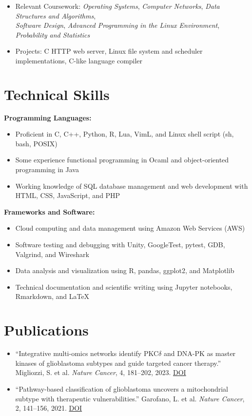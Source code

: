 \documentclass[11pt,a4paper]{article}   %
\begin{document}
\begin{itemize}
  \item Relevant Coursework:
    \textit{Operating Systems}, \textit{Computer Networks}, \textit{Data Structures and Algorithms},\\
    \textit{Software Design}, \textit{Advanced Programming in the Linux Environment}, \textit{Probability and Statistics}
  \item Projects: C HTTP web server, Linux file system and scheduler implementations, C-like language compiler
\end{itemize}

\section*{Technical Skills} %
\textbf{Programming Languages:}
\begin{itemize}
  \item Proficient in C, C++, Python, R, Lua, VimL, and Linux shell script (sh, bash, POSIX)
  \item Some experience functional programming in Ocaml and object-oriented programming in Java
  \item Working knowledge of SQL database management and web development with HTML, CSS, JavaScript, and PHP
\end{itemize}

\textbf{Frameworks and Software:}
\begin{itemize}
  \item Cloud computing and data management using Amazon Web Services (AWS)
  \item Software testing and debugging with Unity, GoogleTest, pytest, GDB, Valgrind, and Wireshark
  \item Data analysis and visualization using R, pandas, ggplot2, and Matplotlib
  \item Technical documentation and scientific writing using Jupyter notebooks, Rmarkdown, and \LaTeX
\end{itemize}

\section*{Publications} %
\begin{itemize}
  \item ``Integrative multi-omics networks identify PKC$\delta$ and DNA-PK as master kinases of glioblastoma subtypes and guide targeted cancer therapy.''
    Migliozzi, S. et al. \textit{Nature Cancer}, 4, 181–202, 2023. \href{https://doi.org/10.1038/s43018-022-00510-x}{DOI}
  \item ``Pathway-based classification of glioblastoma uncovers a mitochondrial subtype with therapeutic vulnerabilities.''
    Garofano, L. et al. \textit{Nature Cancer}, 2, 141–156, 2021. \href{https://doi.org/10.1038/s43018-020-00159-4}{DOI}
\end{itemize}
\end{document}

